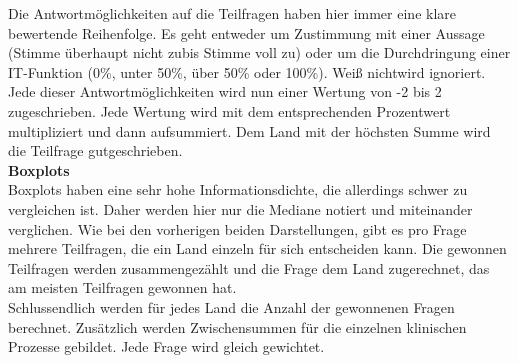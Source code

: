 	Die Antwortmöglichkeiten auf die Teilfragen haben hier immer eine klare bewertende Reihenfolge. Es geht entweder um Zustimmung mit einer Aussage (\glqq Stimme überhaupt nicht zu\grqq{ }bis \glqq Stimme voll zu\grqq) oder um die Durchdringung einer IT-Funktion (0\%, unter 50\%, über 50\% oder 100\%). \glqq Weiß nicht\grqq{ }wird ignoriert. Jede dieser Antwortmöglichkeiten wird nun einer Wertung von -2 bis 2 zugeschrieben. Jede Wertung wird mit dem entsprechenden Prozentwert multipliziert und dann aufsummiert. Dem Land mit der höchsten Summe wird die Teilfrage gutgeschrieben.
	\vspace{\parheadvspace}\\
	\textbf{Boxplots}\\
	Boxplots haben eine sehr hohe Informationsdichte, die allerdings schwer zu vergleichen ist. Daher werden hier nur die Mediane notiert und miteinander verglichen. Wie bei den vorherigen beiden Darstellungen, gibt es pro Frage mehrere Teilfragen, die ein Land einzeln für sich entscheiden kann. Die gewonnen Teilfragen werden zusammengezählt und die Frage dem Land zugerechnet, das am meisten Teilfragen gewonnen hat.\\

	Schlussendlich werden für jedes Land die Anzahl der gewonnenen Fragen berechnet. Zusätzlich werden Zwischensummen für die einzelnen klinischen Prozesse gebildet. Jede Frage wird gleich gewichtet. 

